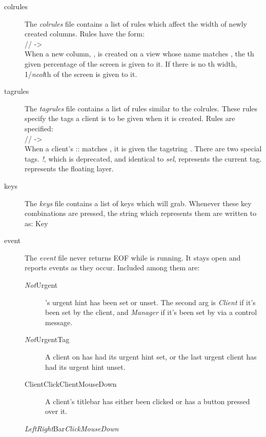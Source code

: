 \begin{description}
\item[colrules] The \emph{colrules} file contains a list of
	rules which affect the width of newly created columns.
	Rules have the form: \\ \SP %
	\MANbr
	\SP\SP // ->  \\ \SP
	\MANbr
	When a new column, , is created on a view whose
	name matches , the th given
	 percentage of the screen is given to it. If
	there is no th width, 1/\emph{ncol}th of the
	screen is given to it.
\item[tagrules] The \emph{tagrules} file contains a list of
	rules similar to the colrules. These rules specify 
	the tags a client is to be given when it is created.
	Rules are specified: \\ \SP
	\MANbr
	\SP\SP // ->  \\ \SP
	\MANbr
	When a client's :: matches
	, it is given the tagstring . There are
	two special tags. \emph{!}, which is deprecated, and identical
	to \emph{sel}, represents the current tag. \emph{\Circum}
	represents the floating layer.
\item[keys] The \emph{keys} file contains a list of keys which
	 will grab. Whenever these key combinations
	are pressed, the string which represents them are
	written to  as: Key 
\item[event] The \emph{event} file never returns EOF while
	 is running. It stays open and reports events
	as they occur. Included among them are:
	\begin{description}
	\item[\emph{Not}Urgent  ]
		's urgent hint has been set or
		unset. The second arg is \emph{Client} if it's
		been set by the client, and \emph{Manager} if
		it's been set by  via a control
		message.
	\item[\emph{Not}UrgentTag  ]
		A client on  has had its urgent hint
		set, or the last urgent client has had its
		urgent hint unset.
	\item[ClientClick\Bar ClientMouseDown  ]
		A client's titlebar has either been clicked or
		has a button pressed over it.
	\item[\emph{Left\Bar Right}Bar\emph{Click\Bar MouseDown}  ]

\end{description}
\end{description}
